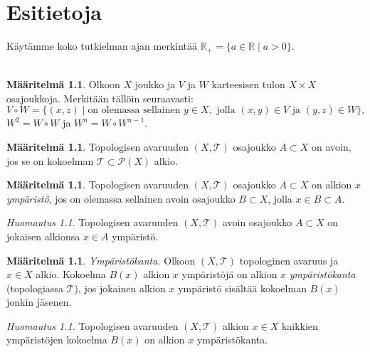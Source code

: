 \documentclass[12pt,a4paper,leqno]{report}
\newcommand{\R}{\mathbb{R}}
\newcommand{\T}{\mathcal{T}}
\newcommand{\Pot}{\mathcal{P}}
\theoremstyle{plain}
\theoremstyle{definition}
\newtheorem{maar}[equation]{Määritelmä}
\theoremstyle{remark}
\newtheorem{huom}[equation]{Huomautus}
\begin{document}
\chapter{Esitietoja}
Käytämme koko tutkielman ajan merkintää $\R_+=\{a\in\R\mid a>0\}$.
\\
\\
\begin{maar}
Olkoon $X$ joukko ja $V$ ja $W$ karteesisen tulon $X\times X$ osajoukkoja.
Merkitään tällöin %
seuraavasti: 
$$V\circ W=\{(x,z)\mid \text{on olemassa sellainen }y \in X,\text{ jolla }(x,y)\in V\text{ ja }(y,z)\in W\},$$ 
$W^2=W\circ W$ ja $W^n=W\circ W^{n-1}$.
\end{maar}
\begin{maar}
Topologisen avaruuden $(X,\T)$ osajoukko $A\subset X$ on avoin, 
jos se on kokoelman $\T\subset\Pot(X)$ alkio.
\end{maar}
\begin{maar}%
Topologisen avaruuden $(X,\T)$ 
osa\-jouk\-ko $A\subset X$ on alkion $x$ \emph{ympäristö}, 
jos on olemassa sellainen avoin osajoukko $B\subset X $, jolla $x\in B\subset A$.
\end{maar}
\begin{huom}
Topologisen avaruuden $(X,\T)$ avoin osajoukko $A\subset X$ on 
jokaisen alkionsa $x\in A$ ympäristö.
\end{huom}
\begin{maar}%
\emph{Ympäristökanta.} 
Olkoon $(X,\T)$ topologinen avaruus ja $x\in X$ alkio. 
Kokoelma $B(x)$ alkion $x$ ympäristöjä on alkion $x$ \emph{ympäristökanta} 
(topologiassa $\T$), jos jokainen alkion $x$ ympäristö sisältää 
kokoelman $B(x)$ jonkin jäsenen. 
\end{maar}
\begin{huom}\label{kaikki_ystöt}
Topologisen avaruuden $(X,\T)$ alkion $x\in X$ kaikkien ympäristöjen kokoelma $B(x)$ on alkion $x$ ympäristökanta.
\end{huom}
\end{document}
